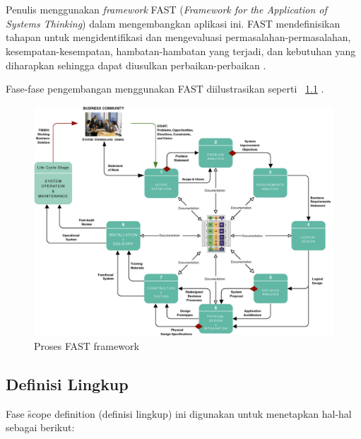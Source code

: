 \chapter{\babTiga}
Penulis menggunakan \textit{framework} FAST (\textit{Framework for the Application of Systems Thinking}) dalam mengembangkan aplikasi ini. FAST mendefinisikan tahapan untuk mengidentifikasi dan mengevaluasi permasalahan-permasalahan, kesempatan-kesempatan, hambatan-hambatan yang terjadi, dan kebutuhan yang diharapkan sehingga dapat diusulkan perbaikan-perbaikan \cite{susanto2013}. 

\noindent
Fase-fase pengembangan menggunakan FAST diilustrasikan seperti \pic~\ref{fig:fast} \cite{whitten2007}.

\begin{figure}
	\centering
	\includegraphics[width=1\textwidth]
		{pics/fastphase.jpg}
	\caption{Proses FAST framework}
	\label{fig:fast}
\end{figure}

\section{Definisi Lingkup}
Fase \f{scope definition} (definisi lingkup) ini digunakan untuk menetapkan  hal-hal sebagai berikut:

